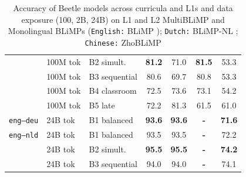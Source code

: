 \documentclass[11pt]{article}
\newcommand{\beetle}{Beetle} %
\begin{document}
\begin{table}[ht!]
\begin{minipage}[t]{0.49\linewidth}
\begin{tabular}{ll l cc cc}
 & 100M tok & B2 simult. & \cellcolor[rgb]{0.827,1.000,0.827} \textbf{81.2} & \cellcolor[rgb]{0.885,1.000,0.885} 71.0 & \cellcolor[rgb]{0.776,1.000,0.776} \textbf{81.5} & \cellcolor[rgb]{0.973,1.000,0.973} 53.3 \\
 & 100M tok & B3 sequential & \cellcolor[rgb]{0.831,1.000,0.831} 80.6 & \cellcolor[rgb]{0.893,1.000,0.893} 69.7 & \cellcolor[rgb]{0.781,1.000,0.781} 80.8 & \cellcolor[rgb]{0.973,1.000,0.973} 53.3 \\
 & 100M tok & B4 classroom & \cellcolor[rgb]{0.876,1.000,0.876} 72.5 & \cellcolor[rgb]{0.871,1.000,0.871} 73.6 & \cellcolor[rgb]{0.836,1.000,0.836} 73.1 & \cellcolor[rgb]{0.965,1.000,0.965} 54.2 \\
 & 100M tok & B5 late & \cellcolor[rgb]{0.877,1.000,0.877} 72.2 & \cellcolor[rgb]{0.829,1.000,0.829} 81.3 & \cellcolor[rgb]{0.918,1.000,0.918} 61.5 & \cellcolor[rgb]{0.909,1.000,0.909} 61.0 \\
\midrule
\texttt{eng--deu} & 24B tok & B1 balanced & \cellcolor[rgb]{0.759,1.000,0.759} \textbf{93.6} & \cellcolor[rgb]{0.762,1.000,0.762} \textbf{93.6} & \textbf{-} & \cellcolor[rgb]{0.822,1.000,0.822} \textbf{71.6} \\
\midrule
\texttt{eng--nld} & 24B tok & B1 balanced & \cellcolor[rgb]{0.759,1.000,0.759} 93.5 & \cellcolor[rgb]{0.763,1.000,0.763} 93.5 & \textbf{-} & \cellcolor[rgb]{0.817,1.000,0.817} 72.2 \\
 & 24B tok & B2 simult. & \cellcolor[rgb]{0.748,1.000,0.748} \textbf{95.5} & \cellcolor[rgb]{0.752,1.000,0.752} \textbf{95.5} & \textbf{-} & \cellcolor[rgb]{0.801,1.000,0.801} \textbf{74.2} \\
 & 24B tok & B3 sequential & \cellcolor[rgb]{0.757,1.000,0.757} 94.0 & \cellcolor[rgb]{0.760,1.000,0.760} 94.0 & \textbf{-} & \cellcolor[rgb]{0.802,1.000,0.802} 74.1 \\
\bottomrule
\end{tabular}
\end{minipage}
\caption{Accuracy of \beetle{} models across curricula and L1s and data exposure (100, 2B, 24B) on L1 and L2 MultiBLiMP \citep{jumelet2025multiblimp} and Monolingual BLiMPs (\texttt{English:} BLiMP \citep{warstadt2020blimp}); \texttt{Dutch:} BLiMP-NL \citep{suijkerbuijk-etal-2025-blimp-nl}; \texttt{Chinese:} ZhoBLiMP \citep{liu-etal-2025-zhoblimp}}
\label{tab:beetle_main}
\end{table}
\end{document}
